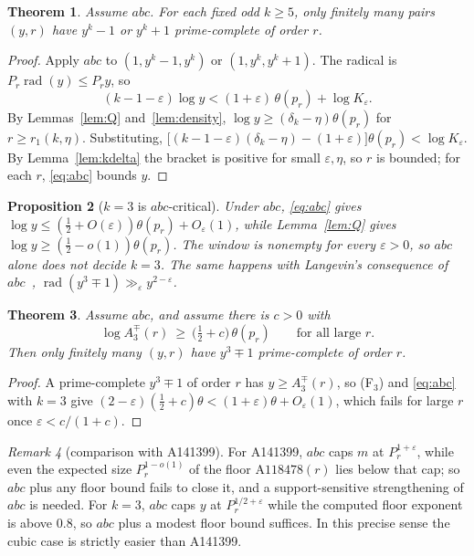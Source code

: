 \documentclass[11pt]{article}
\newtheorem{theorem}{Theorem}[section]
\newtheorem{proposition}[theorem]{Proposition}
\theoremstyle{definition}
\theoremstyle{remark}
\newtheorem{remark}[theorem]{Remark}
\newcommand{\rad}{\operatorname{rad}}
\begin{document}
\begin{theorem}\label{thm:abc}
Assume $abc$. For each fixed odd $k\ge5$, only finitely many pairs $(y,r)$ have
$y^k-1$ or $y^k+1$ prime-complete of order $r$.
\end{theorem}
\begin{proof}
Apply $abc$ to $(1,y^k-1,y^k)$ or $(1,y^k,y^k+1)$. The radical is
$P_r\rad(y)\le P_ry$, so
\begin{equation}\label{eq:abc}
(k-1-\varepsilon)\log y<(1+\varepsilon)\,\theta(p_r)+\log K_\varepsilon .
\end{equation}
By Lemmas~\ref{lem:Q} and~\ref{lem:density}, $\log y\ge(\delta_k-\eta)\theta(p_r)$
for $r\ge r_1(k,\eta)$. Substituting,
$\bigl[(k-1-\varepsilon)(\delta_k-\eta)-(1+\varepsilon)\bigr]\theta(p_r)<\log K_\varepsilon$.
By Lemma~\ref{lem:kdelta} the bracket is positive for small $\varepsilon,\eta$,
so $r$ is bounded; for each $r$, \eqref{eq:abc} bounds $y$.
\end{proof}

\begin{proposition}[$k=3$ is $abc$-critical]\label{prop:critical}
Under $abc$, \eqref{eq:abc} gives $\log y\le(\tfrac12+O(\varepsilon))\theta(p_r)+O_\varepsilon(1)$,
while Lemma~\ref{lem:Q} gives $\log y\ge(\tfrac12-o(1))\theta(p_r)$. The window
is nonempty for every $\varepsilon>0$, so $abc$ alone does not decide $k=3$. The
same happens with Langevin's consequence of $abc$~\cite{Langevin,Elkies},
$\rad(y^3\mp1)\gg_\varepsilon y^{2-\varepsilon}$.
\end{proposition}

\begin{theorem}\label{thm:abcfloor}
Assume $abc$, and assume there is $c>0$ with
\[
\log A_3^{\mp}(r)\ \ge\ \bigl(\tfrac12+c\bigr)\,\theta(p_r)\qquad\text{for all large }r .
\tag{F$_3$}
\]
Then only finitely many $(y,r)$ have $y^3\mp1$ prime-complete of order $r$.
\end{theorem}
\begin{proof}
A prime-complete $y^3\mp1$ of order $r$ has $y\ge A_3^{\mp}(r)$, so
(F$_3$) and \eqref{eq:abc} with $k=3$ give
$(2-\varepsilon)(\tfrac12+c)\theta<(1+\varepsilon)\theta+O_\varepsilon(1)$,
which fails for large $r$ once $\varepsilon<c/(1+c)$.
\end{proof}

\begin{remark}[comparison with A141399]
For A141399, $abc$ caps $m$ at $P_r^{1+\varepsilon}$, while even the expected
size $P_r^{1-o(1)}$ of the floor $\mathrm{A118478}(r)$ lies below that cap; so
$abc$ plus any floor bound fails to close it, and a support-sensitive strengthening of $abc$ is needed. For
$k=3$, $abc$ caps $y$ at $P_r^{1/2+\varepsilon}$ while the computed floor
exponent is above $0.8$, so $abc$ plus a modest floor bound suffices. In this
precise sense the cubic case is strictly easier than A141399.
\end{remark}
\end{document}
